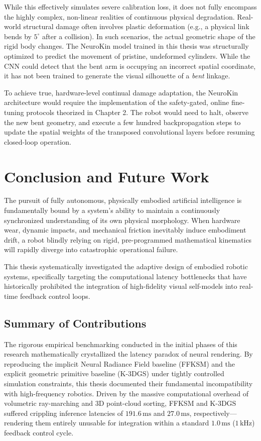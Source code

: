 \documentclass[12pt,a4paper,oneside]{report}
\begin{document}
While this effectively simulates severe calibration loss, it does not fully encompass the highly complex, non-linear realities of continuous physical degradation. Real-world structural damage often involves plastic deformation (e.g., a physical link bends by $5^\circ$ after a collision). In such scenarios, the actual geometric shape of the rigid body changes. The NeuroKin model trained in this thesis was structurally optimized to predict the movement of pristine, undeformed cylinders. While the CNN could detect that the bent arm is occupying an incorrect spatial coordinate, it has not been trained to generate the visual silhouette of a \textit{bent} linkage. 

To achieve true, hardware-level continual damage adaptation, the NeuroKin architecture would require the implementation of the safety-gated, online fine-tuning protocols theorized in Chapter 2. The robot would need to halt, observe the new bent geometry, and execute a few hundred backpropagation steps to update the spatial weights of the transposed convolutional layers before resuming closed-loop operation. 

\chapter{Conclusion and Future Work}

The pursuit of fully autonomous, physically embodied artificial intelligence is fundamentally bound by a system's ability to maintain a continuously synchronized understanding of its own physical morphology. When hardware wear, dynamic impacts, and mechanical friction inevitably induce embodiment drift, a robot blindly relying on rigid, pre-programmed mathematical kinematics will rapidly diverge into catastrophic operational failure. 

This thesis systematically investigated the adaptive design of embodied robotic systems, specifically targeting the computational latency bottlenecks that have historically prohibited the integration of high-fidelity visual self-models into real-time feedback control loops.

\section{Summary of Contributions}

The rigorous empirical benchmarking conducted in the initial phases of this research mathematically crystallized the latency paradox of neural rendering. By reproducing the implicit Neural Radiance Field baseline (FFKSM) and the explicit geometric primitive baseline (K-3DGS) under tightly controlled simulation constraints, this thesis documented their fundamental incompatibility with high-frequency robotics. Driven by the massive computational overhead of volumetric ray-marching and 3D point-cloud sorting, FFKSM and K-3DGS suffered crippling inference latencies of $191.6\,\mathrm{ms}$ and $27.0\,\mathrm{ms}$, respectively—rendering them entirely unusable for integration within a standard $1.0\,\mathrm{ms}$ ($1\,\mathrm{kHz}$) feedback control cycle.
\end{document}
